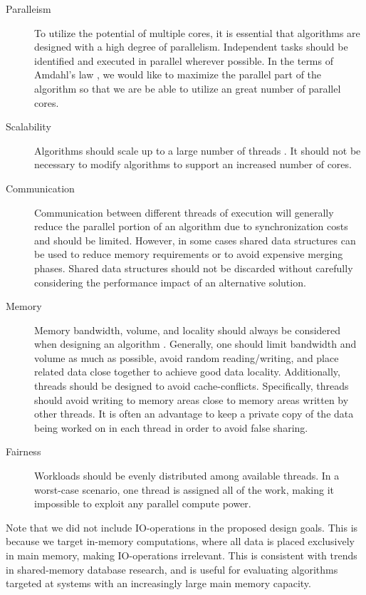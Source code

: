\documentclass[12pt,a4paper,twoside]{report}
\begin{document}
\begin{description}

	\item[Paralleism] To utilize the potential of multiple cores, it
	is essential that algorithms are designed with a high degree of
	parallelism. Independent tasks should be identified and executed
	in parallel wherever possible. In the terms of Amdahl's law
	\cite{amdahl1967validity, hill2008amdahl}, we would like to
	maximize the parallel part of the algorithm so that we are be able
	to utilize an great number of parallel cores.

	\item[Scalability] Algorithms should scale up to a large
	number of threads \cite{kumar1991analysis}. It should not be
	necessary to modify algorithms to support an increased number
	of cores.

	\item[Communication] Communication between different threads
	of execution will generally reduce the parallel portion of an
	algorithm due to synchronization costs and should be limited.
	However, in some cases shared data structures can be used to
	reduce memory requirements or to avoid expensive merging
	phases. Shared data structures should not be discarded without
	carefully considering the performance impact of an alternative
	solution.

	\item[Memory] Memory bandwidth, volume, and locality should always
	be considered when designing an algorithm
	\cite{grunwald1993improving}. Generally, one should limit
	bandwidth and volume as much as possible, avoid random
	reading/writing, and place related data close together to achieve
	good data locality. Additionally, threads should be designed to
	avoid cache-conflicts. Specifically, threads should avoid writing
	to memory areas close to memory areas written by other threads. It
	is often an advantage to keep a private copy of the data being
	worked on in each thread in order to avoid false sharing.

	\item[Fairness] Workloads should be evenly distributed among
	available threads. In a worst-case scenario, one thread is
	assigned all of the work, making it impossible to exploit any
	parallel compute power.

\end{description}

Note that we did not include IO-operations in the proposed design
goals. This is because we target in-memory computations, where all
data is placed exclusively in main memory, making IO-operations
irrelevant. This is consistent with trends in shared-memory database
research, and is useful for evaluating algorithms targeted at systems
with an increasingly large main memory capacity.
\end{document}
